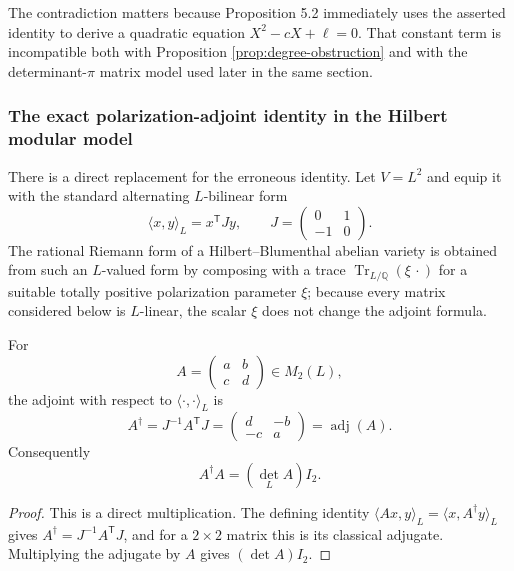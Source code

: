 The contradiction matters because Proposition 5.2 immediately uses the asserted identity to derive a quadratic equation $X^2-cX+\ell=0$. That constant term is incompatible both with Proposition \ref{prop:degree-obstruction} and with the determinant-$\pi$ matrix model used later in the same section.

\subsubsection{The exact polarization-adjoint identity in the Hilbert modular model}
There is a direct replacement for the erroneous identity.  Let $V=L^2$ and equip it with the standard alternating $L$-bilinear form
\[
  \langle x,y\rangle_L=x^{\mathsf T}Jy,\qquad
  J=\begin{pmatrix}0&1\\-1&0\end{pmatrix}.
\]
The rational Riemann form of a Hilbert--Blumenthal abelian variety is obtained from such an $L$-valued form by composing with a trace $\operatorname{Tr}_{L/\mathbb Q}(\xi\,\cdot)$ for a suitable totally positive polarization parameter $\xi$; because every matrix considered below is $L$-linear, the scalar $\xi$ does not change the adjoint formula.

\begin{lemma}\label{lem:adjugate}
For
\[
 A=\begin{pmatrix}a&b\\c&d\end{pmatrix}\in M_2(L),
\]
the adjoint with respect to $\langle\cdot,\cdot\rangle_L$ is
\[
 A^{\dagger}=J^{-1}A^{\mathsf T}J=\begin{pmatrix}d&-b\\-c&a\end{pmatrix}=\operatorname{adj}(A).
\]
Consequently
\begin{equation}\label{eq:adjdet}
 A^{\dagger}A=(\det_L A)I_2.
\end{equation}
\end{lemma}
\begin{proof}
This is a direct multiplication.  The defining identity $\langle Ax,y\rangle_L=\langle x,A^{\dagger}y\rangle_L$ gives $A^{\dagger}=J^{-1}A^{\mathsf T}J$, and for a $2\times2$ matrix this is its classical adjugate.  Multiplying the adjugate by $A$ gives $(\det A)I_2$.
\end{proof}

